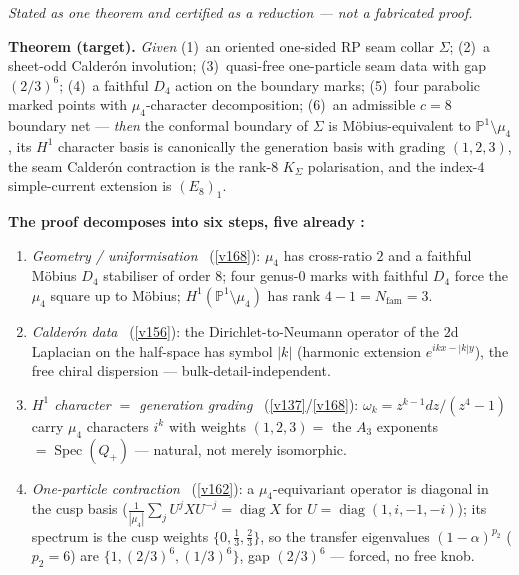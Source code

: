 \documentclass[11pt,a4paper]{article}
\newcommand{\Nfam}{N_{\mathrm{fam}}}
\newcommand{\PP}{\mathbb P^1}
\begin{document}
\begin{keybox}
\emph{Stated as one theorem and certified as a reduction --- not a fabricated proof.}
\par\smallskip\noindent\textbf{Theorem (target).} \emph{Given} (1)~an oriented one-sided RP seam
collar $\Sigma$; (2)~a sheet-odd Calder\'on involution; (3)~quasi-free one-particle seam data with
gap $(2/3)^6$; (4)~a faithful $D_4$ action on the boundary marks; (5)~four parabolic marked points
with $\mu_4$-character decomposition; (6)~an admissible $c{=}8$ boundary net --- \emph{then} the
conformal boundary of $\Sigma$ is M\"obius-equivalent to $\PP\setminus\mu_4$, its $H^1$ character
basis is canonically the generation basis with grading $(1,2,3)$, the seam Calder\'on contraction is
the rank-$8$ $K_\Sigma$ polarisation, and the index-$4$ simple-current extension is $(E_8)_1$.
\par\smallskip\noindent\textbf{The proof decomposes into six steps, five already \mE:}
\begin{enumerate}[leftmargin=2.2em,itemsep=1pt]
\item[\textbf{1--2}] \emph{Geometry / uniformisation} \mE\ (\vref{v168}): $\mu_4$ has cross-ratio $2$
  and a faithful M\"obius $D_4$ stabiliser of order $8$; four genus-$0$ marks with faithful $D_4$
  force the $\mu_4$ square up to M\"obius; $H^1(\PP\setminus\mu_4)$ has rank $4-1=\Nfam=3$.
\item[\textbf{3}] \emph{Calder\'on data} \mE\ (\vref{v156}): the Dirichlet-to-Neumann operator of the
  $2$d Laplacian on the half-space has symbol $|k|$ (harmonic extension $e^{ikx-|k|y}$), the free
  chiral dispersion --- bulk-detail-independent.
\item[\textbf{4}] \emph{$H^1$ character $=$ generation grading} \mE\ (\vref{v137}/\vref{v168}):
  $\omega_k=z^{k-1}dz/(z^4-1)$ carry $\mu_4$ characters $i^k$ with weights $(1,2,3)=$ the $A_3$
  exponents $=\operatorname{Spec}(Q_+)$ --- natural, not merely isomorphic.
\item[\textbf{5}] \emph{One-particle contraction} \mE\ (\vref{v162}): a $\mu_4$-equivariant operator
  is diagonal in the cusp basis ($\tfrac1{|\mu_4|}\sum_j U^jXU^{-j}=\operatorname{diag}X$ for
  $U=\operatorname{diag}(1,i,-1,-i)$); its spectrum is the cusp weights $\{0,\tfrac13,\tfrac23\}$, so
  the transfer eigenvalues $(1-\alpha)^{p_2}$ ($p_2{=}6$) are $\{1,(2/3)^6,(1/3)^6\}$, gap $(2/3)^6$
  --- forced, no free knob.

\end{enumerate}
\end{keybox}
\end{document}
